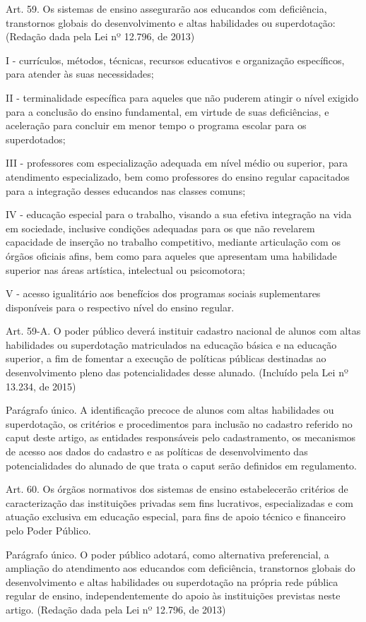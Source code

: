 \documentclass[
]{book}
\begin{document}
Art. 59. Os sistemas de ensino assegurarão aos educandos com deficiência, transtornos globais do desenvolvimento e altas habilidades ou superdotação: (Redação dada pela Lei nº 12.796, de 2013)

I - currículos, métodos, técnicas, recursos educativos e organização específicos, para atender às suas necessidades;

II - terminalidade específica para aqueles que não puderem atingir o nível exigido para a conclusão do ensino fundamental, em virtude de suas deficiências, e aceleração para concluir em menor tempo o programa escolar para os superdotados;

III - professores com especialização adequada em nível médio ou superior, para atendimento especializado, bem como professores do ensino regular capacitados para a integração desses educandos nas classes comuns;

IV - educação especial para o trabalho, visando a sua efetiva integração na vida em sociedade, inclusive condições adequadas para os que não revelarem capacidade de inserção no trabalho competitivo, mediante articulação com os órgãos oficiais afins, bem como para aqueles que apresentam uma habilidade superior nas áreas artística, intelectual ou psicomotora;

V - acesso igualitário aos benefícios dos programas sociais suplementares disponíveis para o respectivo nível do ensino regular.

Art. 59-A. O poder público deverá instituir cadastro nacional de alunos com altas habilidades ou superdotação matriculados na educação básica e na educação superior, a fim de fomentar a execução de políticas públicas destinadas ao desenvolvimento pleno das potencialidades desse alunado. (Incluído pela Lei nº 13.234, de 2015)

Parágrafo único. A identificação precoce de alunos com altas habilidades ou superdotação, os critérios e procedimentos para inclusão no cadastro referido no caput deste artigo, as entidades responsáveis pelo cadastramento, os mecanismos de acesso aos dados do cadastro e as políticas de desenvolvimento das potencialidades do alunado de que trata o caput serão definidos em regulamento.

Art. 60. Os órgãos normativos dos sistemas de ensino estabelecerão critérios de caracterização das instituições privadas sem fins lucrativos, especializadas e com atuação exclusiva em educação especial, para fins de apoio técnico e financeiro pelo Poder Público.

Parágrafo único. O poder público adotará, como alternativa preferencial, a ampliação do atendimento aos educandos com deficiência, transtornos globais do desenvolvimento e altas habilidades ou superdotação na própria rede pública regular de ensino, independentemente do apoio às instituições previstas neste artigo. (Redação dada pela Lei nº 12.796, de 2013)
\end{document}

